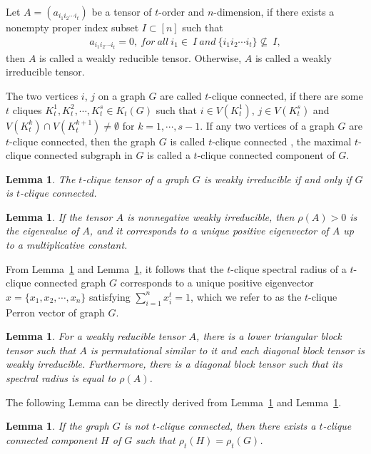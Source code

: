 \documentclass[preprint,12pt]{elsarticle}
\newtheorem{lem}[thm]{Lemma}
\begin{document}
        Let $A=(a_{i_1i_2 \cdots i_t})$ be a tensor of $t$-order and $n$-dimension, if there exists a nonempty proper index subset $I \subset [n]$ such that
			\begin{align*}
                a_{i_1i_2 \cdots i_t}=0,\ for\ all\ i_1 \in\ I\ and\ \{i_1i_2 \cdots i_t\}\not\subseteq\ I,
			\end{align*}
        then $A$ is called a weakly reducible tensor. Otherwise, $A$ is called a weakly irreducible tensor.

        The two vertices $i$, $j$ on a graph $G$ are called $t$-clique connected, if there are some $t$ cliques $K_t^1, K_t^2,\cdots , K_t^s \in K_t(G)$ such that $i \in V(K_t^1)$, $j \in V(K_t^s)$ and $V(K_t^k) \cap V(K_t^{k+1}) \neq \emptyset$ for $k=1, \cdots, s-1$. If any two vertices of a graph $G$ are $t$-clique connected, then the graph $G$ is called $t$-clique connected \cite{Liu2023}, the maximal $t$-clique connected subgraph in $G$ is called a $t$-clique connected component of $G$.

        \begin{lem}\label{2L1}\cite{Liu2023}
            The $t$-clique tensor of a graph $G$ is weakly irreducible if and only if $G$ is $t$-clique connected.
        \end{lem}

        \begin{lem}\label{2L3}\cite{Friedland2013}
            If the tensor $A$ is nonnegative weakly irreducible, then $\rho(A)>0$ is the eigenvalue of $A$, and it corresponds to a unique positive eigenvector of $A$ up to a multiplicative constant.
        \end{lem}

        From Lemma~\ref{2L1} and Lemma~\ref{2L3}, it follows that the $t$-clique spectral radius of a $t$-clique connected graph $G$ corresponds to a unique positive eigenvector $x=\{x_1, x_2, \cdots, x_n\}$ satisfying $\sum_{i=1}^{n} x_i^t = 1$, which we refer to as the $t$-clique Perron vector of graph $G$.

        \begin{lem}\label{2L2}\cite{Shao2013}
            For a weakly reducible tensor $A$, there is a lower triangular block tensor such that $A$ is permutational similar to it and each diagonal block tensor is weakly irreducible. Furthermore, there is a diagonal block tensor such that its spectral radius is equal to $\rho(A)$.
        \end{lem}

        The following Lemma can be directly derived from Lemma~\ref{2L1} and Lemma~\ref{2L2}.
        \begin{lem}\label{2L2-1}
            If the graph $G$ is not $t$-clique connected, then there exists a $t$-clique connected component $H$ of $G$ such that $\rho_t(H) = \rho_t(G)$.
        \end{lem}
\end{document}
